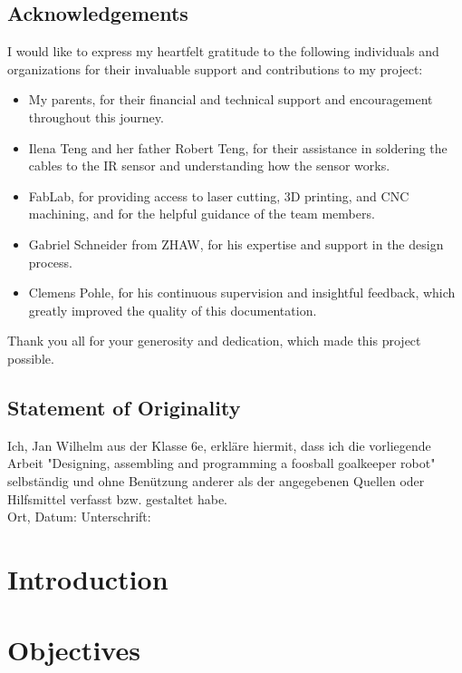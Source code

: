 \documentclass[11pt,openany, english]{book}
\newcommand{\bottompage}{-- \thepage\ --}
\begin{document}
    \section*{Acknowledgements}
    I would like to express my heartfelt gratitude to the following individuals and organizations for their invaluable support and contributions to my project:
    \begin{itemize}
        \item My parents, for their financial and technical support and encouragement throughout this journey.
        \item Ilena Teng and her father Robert Teng, for their assistance in soldering the cables to the IR sensor and understanding how the sensor works.
        \item FabLab, for providing access to laser cutting, 3D printing, and CNC machining, and for the helpful guidance of the team members.
        \item Gabriel Schneider from ZHAW, for his expertise and support in the design process.
        \item Clemens Pohle, for his continuous supervision and insightful feedback, which greatly improved the quality of this documentation.
    \end{itemize}
    Thank you all for your generosity and dedication, which made this project possible.

    \vspace{1cm}
    \section*{Statement of Originality}
    Ich, Jan Wilhelm aus der Klasse 6e, erkläre hiermit, dass ich die vorliegende Arbeit "Designing, assembling and programming a foosball goalkeeper robot" selbständig und ohne Benützung anderer als der angegebenen Quellen oder Hilfsmittel verfasst bzw. gestaltet habe.
    \vspace{1cm}\\
    Ort, Datum: \hspace{6cm} Unterschrift:


    \chapter{Introduction}\label{ch:introduction}
    \renewcommand{\bottompage}{-- \thepage\ --}
    \setcounter{page}{1}
    


    \chapter{Objectives}\label{ch:objectives}
    
\end{document}

